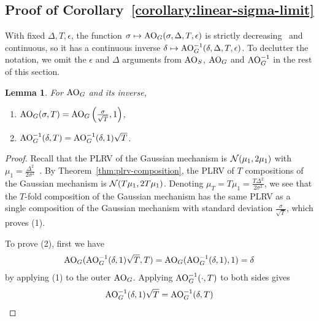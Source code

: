 \documentclass{article}
\theoremstyle{plain}
\newtheorem{lemma}[theorem]{Lemma}
\theoremstyle{definition}
\theoremstyle{remark}
\begin{document}
\subsection{Proof of Corollary~\ref{corollary:linear-sigma-limit}}\label{app:linear-sigma-limit}
With fixed $\Delta, T, \epsilon$, the function 
$\sigma \mapsto \mathrm{AO}_G(\sigma, \Delta, T, \epsilon)$ is strictly 
decreasing~\citep[Lemma 7]{balleImprovingGaussianMechanism2018} and 
continuous, so it has a continuous inverse 
$\delta \mapsto \mathrm{AO}_G^{-1}(\delta, \Delta, T, \epsilon)$. To declutter the 
notation, we omit the $\epsilon$ and $\Delta$ arguments from $\mathrm{AO}_S$, 
$\mathrm{AO}_G$ and $\mathrm{AO}_G^{-1}$ in the rest of this section.

\begin{lemma}\label{lemma:aog-and-inverse-composition-behaviour}
    For $\mathrm{AO}_G$ and its inverse,
    \begin{enumerate}
        \item $\mathrm{AO}_G(\sigma, T) = \mathrm{AO}_G\left(\frac{\sigma}{\sqrt{T}}, 1\right)$,
        \item $\mathrm{AO}_G^{-1}(\delta, T) = \mathrm{AO}_G^{-1}(\delta, 1)\sqrt{T}$.
    \end{enumerate}
\end{lemma}
\begin{proof}
    Recall that the PLRV of the Gaussian mechanism is $\mathcal{N}(\mu_1, 2\mu_1)$ with 
    $\mu_1 = \frac{\Delta^2}{2\sigma^2}$~\citep{sommerPrivacyLossClasses2019}. By Theorem~\ref{thm:plrv-composition},
    the PLRV of $T$ compositions of the Gaussian mechanism is $\mathcal{N}(T\mu_1, 2T\mu_1)$. Denoting 
    $\mu_T = T\mu_1 = \frac{T\Delta^2}{2\sigma^2}$, we see that the $T$-fold composition of the Gaussian 
    mechanism has the same PLRV as a single composition of the Gaussian mechanism with standard deviation 
    $\frac{\sigma}{\sqrt{T}}$, which proves (1).
    
    To prove (2), first we have
    \begin{align}
        \mathrm{AO}_G(\mathrm{AO}_G^{-1}(\delta, 1)\sqrt{T}, T)
        = \mathrm{AO}_G(\mathrm{AO}_G^{-1}(\delta, 1), 1)
        = \delta
    \end{align}
    by applying (1) to the outer $\mathrm{AO}_G$. Applying $\mathrm{AO}_G^{-1}(\cdot, T)$ to both sides gives
    \begin{equation}
        \mathrm{AO}_G^{-1}(\delta, 1)\sqrt{T} = \mathrm{AO}_G^{-1}(\delta, T)
    \end{equation}
\end{proof}
\corollarylinearsigmalimit*
\end{document}
